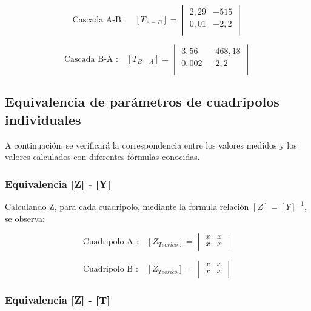 \documentclass[a4paper]{article}
\begin{document}
\begin{equation}
\text{Cascada A-B :}\quad [T_{A-B}] =
\begin{vmatrix}
	2,29 & -515\\
	0,01 & -2,2\\
\end{vmatrix}
\end{equation}

\begin{equation}
\text{Cascada B-A :}\quad [T_{B-A}] =
\begin{vmatrix}
	3,56 & -468,18\\
	0,002 & -2,2\\
\end{vmatrix}
\end{equation}

\subsection*{Equivalencia de parámetros de cuadripolos individuales}

A continuación, se verificará la correspondencia entre los valores medidos y los valores calculados con diferentes fórmulas conocidas.

\subsubsection*{Equivalencia [Z] - [Y]}

Calculando Z, para cada cuadripolo, mediante la formula relación $[Z]=[Y]^{-1}$, se observa:

\begin{equation}
\text{Cuadripolo A :}\quad [Z_{Teorico}] =
\begin{vmatrix}
	x & x\\
	x & x\\
\end{vmatrix}
\end{equation}

\begin{equation}
\text{Cuadripolo B :}\quad [Z_{Teorico}] =
\begin{vmatrix}
	x & x\\
	x & x\\
\end{vmatrix}
\end{equation}

\subsubsection*{Equivalencia [Z] - [T]}
\end{document}
